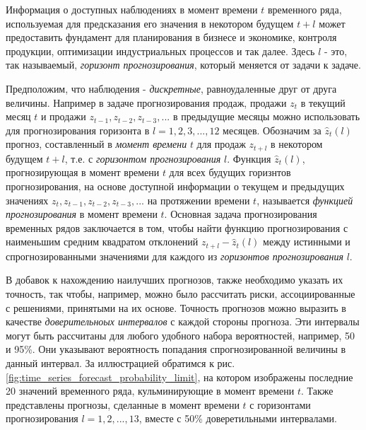 
Информация о доступных наблюдениях в момент времени $t$ временного ряда, 
используемая для предсказания его значения в некотором будущем $t+l$ может 
предоставить фундамент для планирования в бизнесе и экономике, контроля продукции, 
оптимизации индустриальных процессов и так далее. Здесь $l$ - это, так называемый, 
\textit{горизонт прогнозирования}, который меняется от задачи к задаче.

Предположим, что наблюдения - \textit{дискретные}, равноудаленные друг от друга величины. 
Например в задаче прогнозирования продаж, продажи $z_t$ в текущий месяц $t$ и продажи 
$z_{t-1}, z_{t-2}, z_{t-3}, ...$ в предыдущие месяцы можно использовать для 
прогнозирования горизонта в $l = 1, 2, 3, ..., 12$ месяцев. Обозначим за $\hat{z}_t (l)$ 
прогноз, составленный в \textit{момент времени} $t$ для продаж $z_{t+l}$ в некотором будущем $t+l$, т.е.
с \textit{горизонтом прогнозирования} $l$. Функция $\hat{z}_t (l)$, прогнозирующая в момент времени 
$t$ для всех будущих горизнтов прогнозирования, на основе доступной информации о 
текущем и предыдущих значениях $z_t, z_{t-1}, z_{t-2}, z_{t-3}, ...$ на протяжении времени $t$, 
называется \textit{функцией прогнозирования} в момент времени $t$. Основная задача 
прогнозирования временных рядов заключается в том, чтобы найти функцию прогнозирования с 
наименьшим средним квадратом отклонений $z_{t+l} - \hat{z}_t (l)$ между истинными и 
спрогнозированными значениями для каждого из \textit{горизонтов прогнозирования} $l$. 

В добавок к нахождению наилучших прогнозов, также необходимо указать их точность, так 
чтобы, например, можно было рассчитать риски, ассоциированные с решениями, принятыми на 
их основе. Точность прогнозов можно выразить в качестве \textit{доверительноых интервалов} 
с каждой стороны прогноза. Эти интервалы могут быть рассчитаны для любого удобного набора 
вероятностей, например, 50 и 95\%. Они указывают вероятность попадания спрогнозированной 
величины в данный интервал. За иллюстрацией обратимся к рис. \ref{fig:time_series_forecast_probability_limit}, 
на котором изображены последние 20 значений временного ряда, кульминирующие в момент времени $t$. 
Также представлены прогнозы, сделанные в момент времени $t$ с горизонтами прогнозирования 
$l = 1, 2, ..., 13$, вместе с 50\% доверетильными интервалами.

